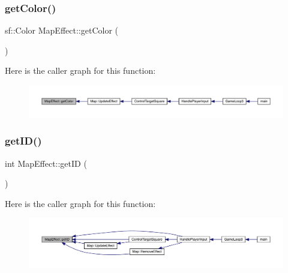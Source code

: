 \mbox{\label{class_map_effect_a8c3e266da325516b48983cf7cf238cf6}} 
\subsubsection{\texorpdfstring{get\+Color()}{getColor()}}
{\footnotesize\ttfamily sf\+::\+Color Map\+Effect\+::get\+Color (\begin{DoxyParamCaption}{ }\end{DoxyParamCaption})}

Here is the caller graph for this function\+:
\nopagebreak
\begin{figure}[H]
\begin{center}
\leavevmode
\includegraphics[width=350pt]{de/de4/class_map_effect_a8c3e266da325516b48983cf7cf238cf6_icgraph}
\end{center}
\end{figure}
\mbox{\label{class_map_effect_af05848201790b0038c5b61659b116706}} 
\subsubsection{\texorpdfstring{get\+I\+D()}{getID()}}
{\footnotesize\ttfamily int Map\+Effect\+::get\+ID (\begin{DoxyParamCaption}{ }\end{DoxyParamCaption})}

Here is the caller graph for this function\+:
\nopagebreak
\begin{figure}[H]
\begin{center}
\leavevmode
\includegraphics[width=350pt]{de/de4/class_map_effect_af05848201790b0038c5b61659b116706_icgraph}
\end{center}
\end{figure}
\mbox{\label{class_map_effect_a7aeebd5eef57c00feabca583a38c5361}} 
